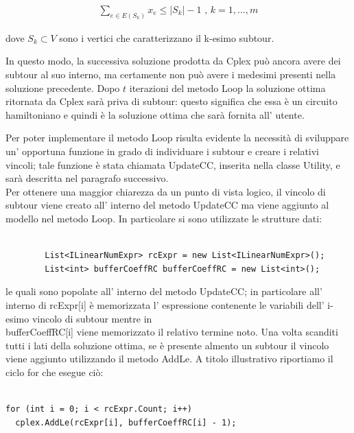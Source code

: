 \documentclass[11pt]{article}
\begin{document}
\begin{eqnarray}
\displaystyle{\sum_{e \in E(S_k)} x_e \leq |S_k| - 1} \text{ , } k = 1,\ldots,m
\end{eqnarray}


dove $S_k\subset V$ sono i vertici che caratterizzano il k-esimo subtour.

In questo modo, la successiva soluzione prodotta da Cplex pu\`o ancora avere dei subtour al suo interno, ma certamente non pu\`o avere i medesimi presenti nella soluzione precedente. Dopo $t$ iterazioni del metodo Loop la soluzione ottima ritornata da Cplex sar\`a priva di subtour: questo significa che essa \`e un circuito hamiltoniano e quindi \`e la soluzione ottima che sar\`a fornita all' utente.

Per poter implementare il metodo Loop risulta evidente la necessit\`a di sviluppare un' opportuna funzione in grado di individuare i subtour e creare i relativi vincoli; tale funzione \`e stata chiamata UpdateCC, inserita nella classe Utility, e sar\`a descritta nel paragrafo successivo.\\ Per ottenere una maggior chiarezza da un punto di vista logico, il vincolo di subtour viene creato all' interno del metodo UpdateCC ma viene aggiunto al modello nel metodo Loop. In particolare si sono utilizzate le strutture dati:

\begin{lstlisting}

        List<ILinearNumExpr> rcExpr = new List<ILinearNumExpr>();
        List<int> bufferCoeffRC bufferCoeffRC = new List<int>();

\end{lstlisting}

le quali sono popolate all' interno del metodo UpdateCC; in particolare all' interno di rcExpr[i] \`e  memorizzata l' espressione contenente le variabili dell' i-esimo vincolo di subtour mentre in \\ bufferCoeffRC[i] viene memorizzato il relativo termine noto. Una volta scanditi tutti i lati della soluzione ottima, se \`e  presente almento un subtour il vincolo viene aggiunto utilizzando il metodo AddLe. A titolo illustrativo riportiamo il ciclo for che esegue ci\`o:

\begin{lstlisting}
                
for (int i = 0; i < rcExpr.Count; i++)
  cplex.AddLe(rcExpr[i], bufferCoeffRC[i] - 1);
              
\end{lstlisting}
\end{document}
